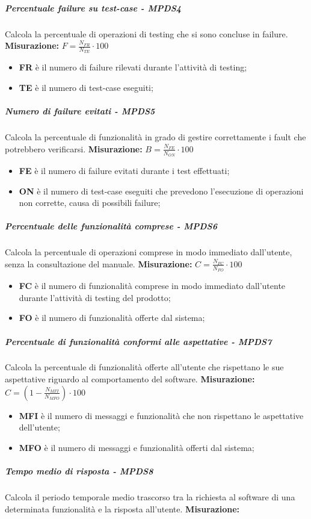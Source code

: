 \subparagraph{Percentuale failure su test-case - MPDS4}
Calcola la percentuale di operazioni di testing che si sono concluse in failure.
\textbf{Misurazione:}
$F=\frac{N_{FR}}{N_{TE}} \cdot 100$
\begin{itemize}
	\item \textbf{FR} è il numero di failure rilevati durante l'attività di testing;
	\item \textbf{TE} è il numero di test-case eseguiti;
\end{itemize}
\subparagraph{Numero di failure evitati - MPDS5}
Calcola la percentuale di funzionalità in grado di gestire correttamente i fault che potrebbero verificarsi.
\textbf{Misurazione:}
$B=\frac{N_{FE}}{N_{ON}} \cdot 100$
\begin{itemize}
	\item \textbf{FE} è il numero di failure evitati durante i test effettuati;
	\item \textbf{ON} è il numero di test-case eseguiti che prevedono l'esecuzione di operazioni non corrette, causa di possibili failure;
\end{itemize}
\subparagraph{Percentuale delle funzionalità comprese  - MPDS6}
Calcola la percentuale di operazioni comprese in modo immediato dall'utente, senza la consultazione del manuale.
\textbf{Misurazione:}
$C=\frac{N_{FC}}{N_{FO}} \cdot 100$
\begin{itemize}
	\item \textbf{FC} è il numero di funzionalità comprese in modo immediato dall'utente durante l'attività di testing del prodotto;
	\item \textbf{FO} è il numero di funzionalità offerte dal sistema;
\end{itemize}
\subparagraph{Percentuale di funzionalità conformi alle aspettative - MPDS7}
Calcola la percentuale di funzionalità offerte all'utente che rispettano le sue aspettative riguardo al comportamento del software.
\textbf{Misurazione:}
$C=(1-\frac{N_{MFI}}{N_{MFO}}) \cdot 100$
\begin{itemize}
	\item \textbf{MFI} è il numero di messaggi e funzionalità che non rispettano le aspettative dell'utente;
	\item \textbf{MFO} è il numero di messaggi e funzionalità offerti dal sistema;
\end{itemize}
\subparagraph{Tempo medio di risposta - MPDS8}
Calcola il periodo temporale medio trascorso tra la richiesta al software di una determinata funzionalità e la risposta all’utente.
\textbf{Misurazione:}
